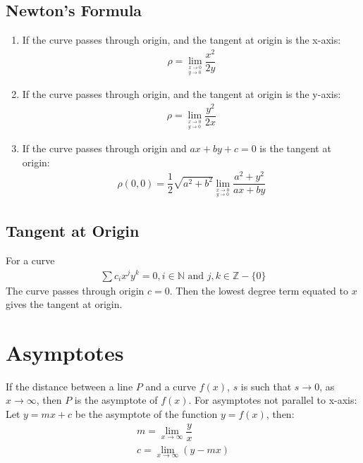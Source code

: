 \documentclass[../main.tex]{subfile}
\begin{document}
    \subsection{Newton's Formula}
    \begin{enumerate}
    \item If the curve passes through origin, and the tangent at origin is the x-axis:
        \begin{align}
            \rho=\lim_{^{x\to0}_{y\to0}} \dfrac{x^2}{2y}
        \end{align}
    \item If the curve passes through origin, and the tangent at origin is the y-axis:
        \begin{align}
            \rho=\lim_{^{x\to0}_{y\to0}} \dfrac{y^2}{2x}
        \end{align}
    \item If the curve passes through origin and $ax+by+c=0$ is the tangent at origin:
        \begin{align}
            \rho(0,0)=\dfrac{1}{2}\sqrt{a^2+b^2} \lim_{^{x\to0}_{y\to0}} \dfrac{a^2+y^2}{ax+by}
        \end{align}
    \end{enumerate}

    \subsection{Tangent at Origin}
    For a curve
    \begin{align}
        \sum c_i x^j y^k = 0, i \in \mathbb{N} \text{ and } j, k \in \mathbb{Z} - \lbrace 0 \rbrace
    \end{align}
    The curve passes through origin $c = 0$. Then the lowest degree term equated to $x$ gives the tangent at origin.

    \section{Asymptotes}
    If the distance between a line $P$ and a curve $f(x)$, $s$ is such that $s\to0$, as $x\to\infty$, then $P$ is the asymptote of $f(x)$. For asymptotes not parallel to x-axis:\newline
    Let $y=mx+c$ be the asymptote of the function $y=f(x)$, then:
    \begin{align}
        m=\lim_{x\to\infty} \dfrac{y}{x}\\
        c=\lim_{x\to\infty} (y-mx)
    \end{align}
\end{document}
